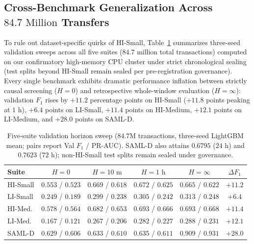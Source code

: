 \documentclass[pdflatex,sn-mathphys,Numbered]{sn-jnl}
\theoremstyle{thmstyleone}
\begin{document}
\subsection{Cross-Benchmark Generalization Across $84.7\text{ Million}$ Transfers}\label{sec:cross_benchmark}

To rule out dataset-specific quirks of HI-Small, Table~\ref{tab:cross_benchmark_generalization} summarizes three-seed validation sweeps across all five suites ($84.7\text{ million}$ total transactions) computed on our confirmatory high-memory CPU cluster under strict chronological sealing (test splits beyond HI-Small remain sealed per pre-registration governance). Every single benchmark exhibits dramatic performance inflation between strictly causal screening ($H = 0$) and retrospective whole-window evaluation ($H = \infty$): validation $F_1$ rises by $+11.2$ percentage points on HI-Small ($+11.8$ points peaking at $1\text{ h}$), $+6.4$ points on LI-Small, $+11.4$ points on HI-Medium, $+12.1$ points on LI-Medium, and $+28.0$ points on SAML-D.

\begin{table}[t]
\centering
\caption{Five-suite validation horizon sweep ($84.7\text{M}$ transactions, three-seed LightGBM mean; pairs report Val $F_1$ / PR-AUC). SAML-D also attains $0.6795$ ($24\text{ h}$) and $0.7623$ ($72\text{ h}$); non-HI-Small test splits remain sealed under governance.}
\label{tab:cross_benchmark_generalization}
\scriptsize
\setlength{\tabcolsep}{2.0pt}
\begin{tabular}{@{}lccccc@{}}
\toprule
\textbf{Suite} & \textbf{$H = 0$} & \textbf{$H = 10\text{ m}$} & \textbf{$H = 1\text{ h}$} & \textbf{$H = \infty$} & \textbf{$\Delta F_1$} \\
\midrule
HI-Small & $0.553$ / $0.523$ & $0.669$ / $0.618$ & $0.672$ / $0.625$ & $0.665$ / $0.622$ & $+11.2$ \\
LI-Small & $0.249$ / $0.189$ & $0.299$ / $0.238$ & $0.305$ / $0.242$ & $0.313$ / $0.248$ & $+6.4$ \\
HI-Med. & $0.578$ / $0.564$ & $0.682$ / $0.653$ & $0.693$ / $0.666$ & $0.693$ / $0.668$ & $+11.4$ \\
LI-Med. & $0.167$ / $0.121$ & $0.267$ / $0.206$ & $0.282$ / $0.227$ & $0.288$ / $0.231$ & $+12.1$ \\
SAML-D & $0.629$ / $0.606$ & $0.633$ / $0.610$ & $0.635$ / $0.611$ & $0.909$ / $0.931$ & $+28.0$ \\
\bottomrule
\end{tabular}
\end{table}
\end{document}

